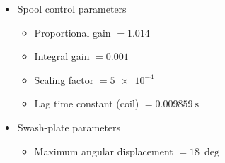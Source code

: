 \documentclass[12pt,a4paper,oneside]{book}
\begin{document}
\begin{onehalfspace}
{\begin{itemize}
\begin{itemize}
			\item Orifice opening offset T-A $=\SI{1.9e-4}{\meter}$
			\item Orifice opening offset T-B $=\SI{1.9e-4}{\meter}$
			\item Leakage area $=\SI{1e-8}{\square\meter}$
		\end{itemize}
		\item Spool control parameters
		\begin{itemize}
			\item Proportional gain $=1.014$
			\item Integral gain $=0.001$			
			\item Scaling factor $=\SI{5e-4}{}$
			\item Lag time constant (coil) $=\SI{0.009859}{\second}$
		\end{itemize}
		\item Swash-plate parameters
		\begin{itemize}
			\item Maximum angular displacement $=\SI{18}{\deg}$
		\end{itemize}
	\end{itemize}
}


\end{onehalfspace}
\end{document}
